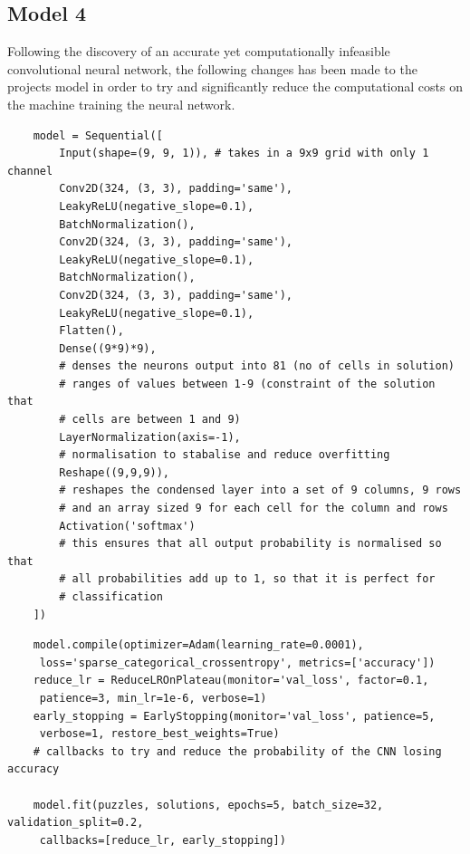 \documentclass[]{final_report}
\begin{document}
\subsection{Model 4}

Following the discovery of an accurate yet computationally infeasible convolutional neural network, the following changes has been made to the projects model in order to try and significantly reduce the computational costs on the machine training the neural network.

\begin{verbatim}
    model = Sequential([
        Input(shape=(9, 9, 1)), # takes in a 9x9 grid with only 1 channel
        Conv2D(324, (3, 3), padding='same'),
        LeakyReLU(negative_slope=0.1),
        BatchNormalization(),
        Conv2D(324, (3, 3), padding='same'),
        LeakyReLU(negative_slope=0.1),
        BatchNormalization(),
        Conv2D(324, (3, 3), padding='same'),
        LeakyReLU(negative_slope=0.1),
        Flatten(),
        Dense((9*9)*9),
        # denses the neurons output into 81 (no of cells in solution) 
        # ranges of values between 1-9 (constraint of the solution that 
        # cells are between 1 and 9)
        LayerNormalization(axis=-1),
        # normalisation to stabalise and reduce overfitting
        Reshape((9,9,9)),
        # reshapes the condensed layer into a set of 9 columns, 9 rows 
        # and an array sized 9 for each cell for the column and rows
        Activation('softmax')
        # this ensures that all output probability is normalised so that 
        # all probabilities add up to 1, so that it is perfect for 
        # classification
    ])
\end{verbatim}

\begin{verbatim}
    model.compile(optimizer=Adam(learning_rate=0.0001), 
     loss='sparse_categorical_crossentropy', metrics=['accuracy'])
    reduce_lr = ReduceLROnPlateau(monitor='val_loss', factor=0.1, 
     patience=3, min_lr=1e-6, verbose=1)
    early_stopping = EarlyStopping(monitor='val_loss', patience=5, 
     verbose=1, restore_best_weights=True)
    # callbacks to try and reduce the probability of the CNN losing accuracy

    model.fit(puzzles, solutions, epochs=5, batch_size=32, validation_split=0.2,
     callbacks=[reduce_lr, early_stopping])
\end{verbatim}
\end{document}
